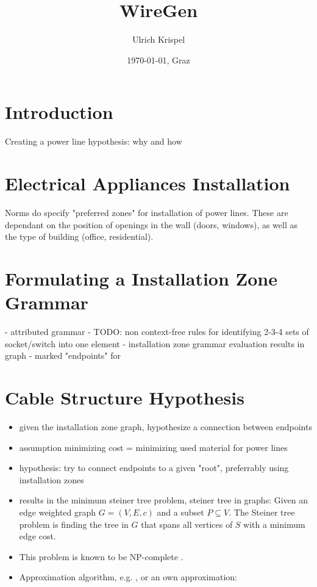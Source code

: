 \documentclass[12pt]{scrartcl}
\title{WireGen}
\author{Ulrich Krispel}
\date{\today{}, Graz}
\begin{document}
 
\maketitle

\section{Introduction}

Creating a power line hypothesis: why and how

\section{Electrical Appliances Installation}

Norms do specify "preferred zones" for installation of power lines. These are dependant on the position of openings in the wall (doors, windows), as well as the type of building (office, residential).

\section{Formulating a Installation Zone Grammar}

- attributed grammar
- TODO: non context-free rules for identifying 2-3-4 sets of socket/switch into one element
- installation zone grammar evaluation results in graph
- marked "endpoints" for 

\section{Cable Structure Hypothesis}

\begin{itemize}
\item given the installation zone graph, hypothesize a connection between endpoints
\item assumption minimizing cost = minimizing used material for power lines
\item hypothesis: try to connect endpoints to a given "root", preferrably using installation zones
\item results in the minimum steiner tree problem, steiner tree in graphs: Given an edge weighted graph $G = (V, E, c)$ and a subset $P \subseteq V$. The  Steiner tree problem is finding the tree in $G$ that spans all vertices of $S$ with a minimum edge cost. 
\item This problem is known to be NP-complete \cite{Hwang1992}.
\item Approximation algorithm, e.g. \cite{Kou1981}, or an own approximation: 
\end{itemize}



 
\end{document}
